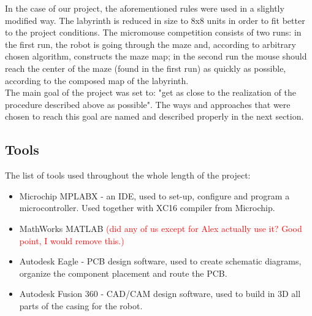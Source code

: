  In the case of our project, the aforementioned rules were used in a slightly modified way. The labyrinth is reduced in size to 8x8 units in order to fit better to the project conditions. The micromouse competition consists of two runs: in the first run, the robot is going through the maze and, according to arbitrary chosen algorithm, constructs the maze map; in the second run the mouse should reach the center of the maze (found in the first run) as quickly as possible, according to the composed map of the labyrinth. \\
 The main goal of the project was set to:  "get as close to the realization of the procedure described above as possible".
 The ways and approaches that were chosen to reach this goal are named and described properly in the next section.
 
 \subsection{Tools}
 
The list of tools used throughout the whole length of the project:
\begin{itemize}
    \item Microchip MPLABX - an IDE, used to set-up, configure and program a microcontroller. Used together with XC16 compiler from Microchip.
    \item MathWorks MATLAB \textcolor{red}{(did any of us except for Alex actually use it? Good point, I would remove this.)}
    \item Autodesk Eagle - PCB design software, used to create schematic diagrams, organize the component placement and route the PCB.
    \item Autodesk Fusion 360 -  CAD/CAM design software, used to build in 3D all parts of the casing for the robot.
\end{itemize}

